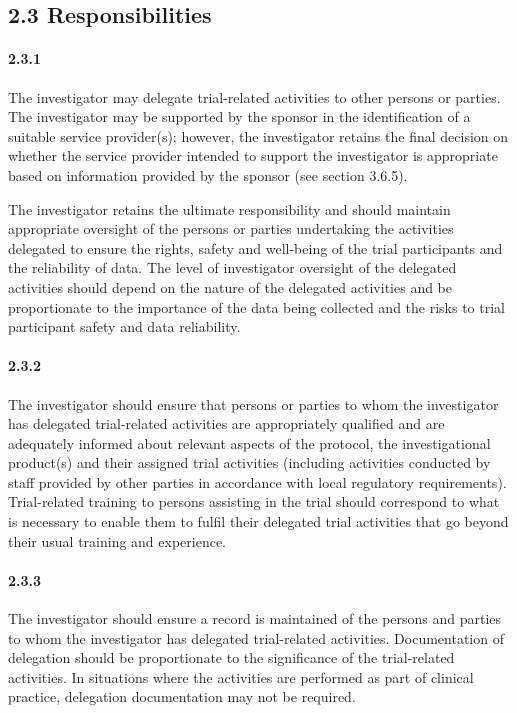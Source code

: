 \documentclass[11pt]{article}
\begin{document}
\subsection{2.3 Responsibilities}

\paragraph{2.3.1} The investigator may delegate trial-related activities to other persons or parties. The investigator may be supported by the sponsor in the identification of a suitable service provider(s); however, the investigator retains the final decision on whether the service provider intended to support the investigator is appropriate based on information provided by the sponsor (see section 3.6.5).

The investigator retains the ultimate responsibility and should maintain appropriate oversight of the persons or parties undertaking the activities delegated to ensure the rights, safety and well-being of the trial participants and the reliability of data. The level of investigator oversight of the delegated activities should depend on the nature of the delegated activities and be proportionate to the importance of the data being collected and the risks to trial participant safety and data reliability.


\paragraph{2.3.2} The investigator should ensure that persons or parties to whom the investigator has delegated trial-related activities are appropriately qualified and are adequately informed about relevant aspects of the protocol, the investigational product(s) and their assigned trial activities (including activities conducted by staff provided by other parties in accordance with local regulatory requirements). Trial-related training to persons assisting in the trial should correspond to what is necessary to enable them to fulfil their delegated trial activities that go beyond their usual training and experience.

\paragraph{2.3.3} The investigator should ensure a record is maintained of the persons and parties to whom the investigator has delegated trial-related activities. Documentation of delegation should be proportionate to the significance of the trial-related activities. In situations where the activities are performed as part of clinical practice, delegation documentation may not be required.
\end{document}
